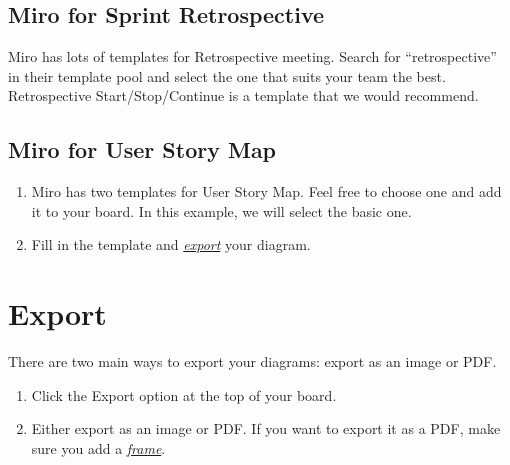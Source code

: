 \documentclass[letterpaper,10pt,english]{jupyterBook}
\begin{document}
\subsection{Miro for Sprint Retrospective}
\label{\detokenize{appendices/appendix_d/miro_guide:miro-for-sprint-retrospective}}
\sphinxAtStartPar
Miro has lots of templates for Retrospective meeting.  Search for “retrospective” in their template pool and
select the one that suits your team the best.  Retrospective Start/Stop/Continue is a template that we would
recommend.


\subsection{Miro for User Story Map}
\label{\detokenize{appendices/appendix_d/miro_guide:miro-for-user-story-map}}\begin{enumerate}
%
\item {} 
\sphinxAtStartPar
Miro has two templates for User Story Map. Feel free to choose one and add it to your board. In this example,
we will select the basic one.

\item {} 
\sphinxAtStartPar
Fill in the template and {\hyperref[\detokenize{appendices/appendix_d/miro_guide:export}]{\emph{export}}} your diagram.

\end{enumerate}


\section{Export}
\label{\detokenize{appendices/appendix_d/miro_guide:export}}
\sphinxAtStartPar
There are two main ways to export your diagrams: export as an image or PDF.
\begin{enumerate}
%
\item {} 
\sphinxAtStartPar
Click the Export option at the top of your board.

\item {} 
\sphinxAtStartPar
Either export as an image or PDF.  If you want to export it as a PDF, make sure you add a {\hyperref[\detokenize{appendices/appendix_d/miro_guide:frame}]{\emph{frame}}}.

\end{enumerate}
\end{document}
